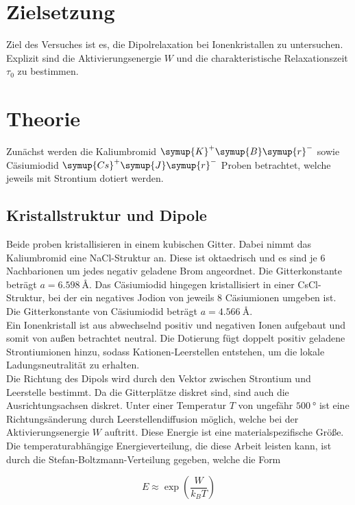 \section{Zielsetzung}

Ziel des Versuches ist es, die Dipolrelaxation bei Ionenkristallen zu untersuchen. Explizit sind die Aktivierungsenergie $W$ und die charakteristische 
Relaxationszeit $\tau_0$ zu bestimmen.

\section{Theorie}
\label{sec:Theorie}

Zunächst werden die Kaliumbromid $\symup{K}^{+}\symup{B}\symup{r}^{-}$ sowie Cäsiumiodid $\symup{Cs}^{+}\symup{J}\symup{r}^{-}$ Proben betrachtet, welche 
jeweils mit Strontium dotiert werden. 

\subsection{Kristallstruktur und Dipole}

Beide proben kristallisieren in einem kubischen Gitter. Dabei nimmt das Kaliumbromid eine NaCl-Struktur an. Diese ist oktaedrisch und es sind je 6 Nachbarionen um jedes 
negativ geladene Brom angeordnet. Die Gitterkonstante beträgt $a = \SI{6.598}{\angstrom}$. Das Cäsiumiodid hingegen kristallisiert in einer CsCl-Struktur, bei der 
ein negatives Jodion von jeweils 8 Cäsiumionen umgeben ist. Die Gitterkonstante von Cäsiumiodid beträgt $a = \SI{4.566}{\angstrom}$.\\
Ein Ionenkristall ist aus abwechselnd positiv und negativen Ionen aufgebaut und somit von außen betrachtet neutral. Die Dotierung fügt doppelt positiv geladene 
Strontiumionen hinzu, sodass Kationen-Leerstellen entstehen, um die lokale Ladungsneutralität zu erhalten.\\
Die Richtung des Dipols wird durch den Vektor zwischen Strontium und Leerstelle bestimmt. Da die Gitterplätze diskret sind, sind auch die Ausrichtungsachsen diskret. 
Unter einer Temperatur $T$ von ungefähr $\SI{500}{\degree}$ ist eine Richtungsänderung durch Leerstellendiffusion möglich, welche bei der Aktivierungsenergie $W$
auftritt. Diese Energie ist eine materialspezifische Größe. Die temperaturabhängige Energieverteilung, die diese Arbeit leisten kann, ist durch die Stefan-Boltzmann-Verteilung
gegeben, welche die Form 

\begin{equation*}
    E \approx \exp{\left(\frac{W}{k_B T}\right)}
\end{equation*}

